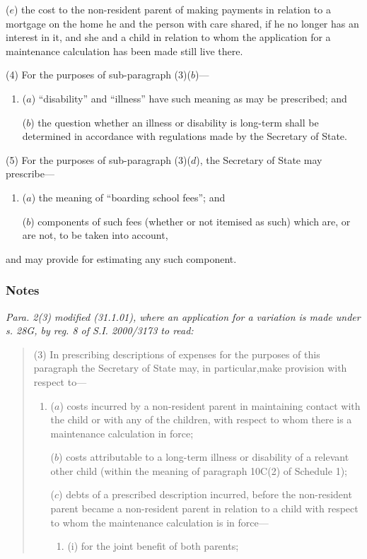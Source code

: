 \documentclass[a4paper]{article}
\newcommand\amendment[1]{\subsubsection*{Notes}{\itshape\frenchspacing\footnotesize #1 \par}}
\begin{document}
{\begin{enumerate}
($e$) the cost to the non-resident parent of making payments in relation to a mortgage on the home he and the person with care shared, if he no longer has an interest in it, and she and a child in relation to whom the application for a maintenance calculation has been made still live there.
\end{enumerate}

(4) For the purposes of sub-paragraph (3)($b$)---
\begin{enumerate}\item[]
($a$) “disability” and “illness” have such meaning as may be prescribed; and

($b$) the question whether an illness or disability is long-term shall be determined in accordance with regulations made by the Secretary of State.
\end{enumerate}

(5) For the purposes of sub-paragraph (3)($d$), the Secretary of State may prescribe---
\begin{enumerate}\item[]
($a$) the meaning of “boarding school fees”; and

($b$) components of such fees (whether or not itemised as such) which are, or are not, to be taken into account,
\end{enumerate}
and may provide for estimating any such component.

\amendment{
Para. 2(3) modified (31.1.01), where an application for a variation is made under s. 28G, by reg. 8 of S.I. 2000/3173 to read:
\begin{quotation}
(3) In prescribing descriptions of expenses for the purposes of this paragraph the Secretary of State may, in particular,make provision with respect to---
\begin{enumerate}\item[]
($a$) costs incurred by a non-resident parent in maintaining contact with the child or with any of the children, with respect to whom there is a maintenance calculation in force;

($b$) costs attributable to a long-term illness or disability of a relevant other child (within the meaning of paragraph 10C(2) of Schedule 1);

($c$) debts of a prescribed description incurred, before the non-resident parent became a non-resident parent in relation to a child with respect to whom the maintenance calculation is in force---
\begin{enumerate}\item[]
(i)
for the joint benefit of both parents;


\end{enumerate}
\end{enumerate}
\end{quotation}}}
\end{document}
